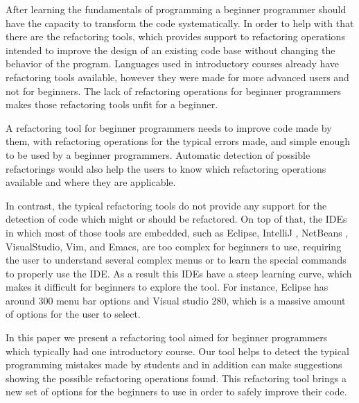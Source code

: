 After learning the fundamentals of programming a beginner programmer should have the
capacity to transform the code systematically.
In order to help with that there are the refactoring tools,
which provides support to refactoring operations intended to improve the design
of an existing code base \cite{fowler1999refactoring} without changing the behavior of the program.
Languages used in introductory courses already have refactoring tools available,
however they were made for more advanced users and not for beginners.
The lack of refactoring operations for beginner programmers makes those refactoring tools
unfit for a beginner.

A refactoring tool for beginner programmers needs to improve code made by them, %
with refactoring operations for the typical errors made, and simple enough to be
used by a beginner programmers.
Automatic detection of possible refactorings would also help the users to know
which refactoring operations available and where they are applicable.

In contrast, the typical refactoring tools do not provide any support for the detection of code which might or should %
be refactored.
On top of that, the IDEs in which most of those tools are embedded, such as Eclipse\cite{carlson2005eclipse},
 IntelliJ \cite{bock2011intellij}, NetBeans \cite{boudreau2002netbeans}, VisualStudio\cite{ford2011coding},
 Vim\cite{moolenaar2008vim}, and Emacs\cite{stallman2007gnu}, are too complex for beginners
 to use, requiring the user to understand several complex menus or to learn
 the special commands to properly use the IDE.
As a result this IDEs have a steep learning curve, which makes it difficult for beginners
to explore the tool. %
For instance, Eclipse has around 300 menu bar options and Visual studio 280, which is a massive amount
of options for the user to select.


In this paper we present a refactoring tool aimed for beginner programmers which typically
had one introductory course.
Our tool helps to detect the typical programming mistakes made by students and in
addition can make suggestions showing the possible refactoring operations found.
This refactoring tool brings a new set of options for the beginners to use
in order to safely improve their code.



